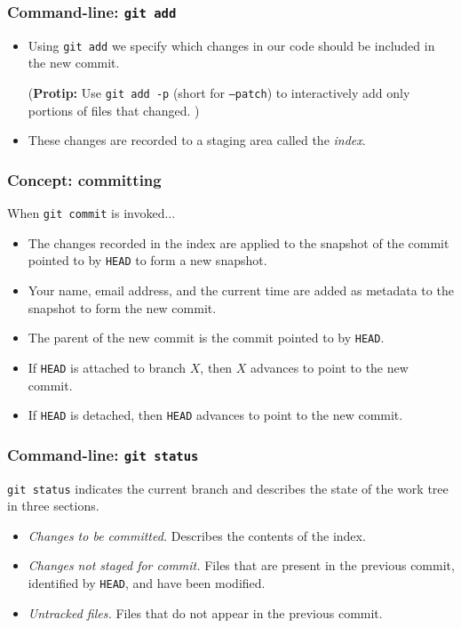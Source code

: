 \documentclass{beamer}
\newcommand{\HEAD}{\texttt{HEAD}}
\newcommand{\protip}[1]{(\textbf{Protip:} #1)}
\begin{document}
\begin{frame}
    \frametitle{Command-line: \texttt{git add}}

    \begin{itemize}
        \item
            Using \texttt{git add} we specify which changes in our code should
            be included in the new commit.

            \protip{
                Use \texttt{git add -p} (short for \texttt{--patch}) to
                interactively add only portions of files that changed.
            }
        \item
            These changes are recorded to a staging area called the
            \emph{index}.
    \end{itemize}
\end{frame}

\begin{frame}
    \frametitle{Concept: committing}

    When \texttt{git commit} is invoked...

    \begin{itemize}
        \item
            The changes recorded in the index are applied to the snapshot of
            the commit pointed to by \HEAD{} to form a new snapshot.
        \item
            Your name, email address, and the current time are added as
            metadata to the snapshot to form the new commit.
        \item
            The parent of the new commit is the commit pointed to by \HEAD.
        \item
            If \HEAD{} is attached to branch $X$, then $X$ advances to point to
            the new commit.
        \item
            If \HEAD{} is detached, then \HEAD{} advances to point to the new
            commit.
    \end{itemize}
\end{frame}

\begin{frame}
    \frametitle{Command-line: \texttt{git status}}

    \texttt{git status} indicates the current branch and describes the state of
    the work tree in three sections.

    \begin{itemize}
        \item \textit{Changes to be committed.}
            Describes the contents of the index.

        \item \textit{Changes not staged for commit.}
            Files that are present in the previous commit, identified by
            \HEAD, and have been modified.

        \item \textit{Untracked files.}
            Files that do not appear in the previous commit.
    \end{itemize}
\end{frame}
\end{document}
